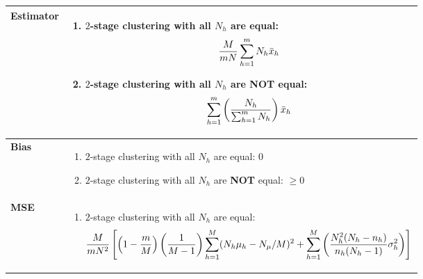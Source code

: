 \begin{longtable}{|p{2cm}|p{12cm}|}
    \hline\endfirsthead
    \hline\endhead
    \hline\endfoot
    \hline\endlastfoot

    \textbf{Estimator} & \begin{minipage}{11cm}
        \vspace{0.2cm}
        \begin{enumerate}
            \item $2$-stage clustering with all $N_h$ are equal:
            \[
                \dfrac{M}{mN} \displaystyle\sum_{h=1}^{m}
                N_h\bar{x}_h
            \]

            \item $2$-stage clustering with all $N_h$ are \textbf{NOT} equal:
            \[
                \displaystyle\sum_{h=1}^{m}
                \left( 
                    \frac{N_h}{\sum_{h=1}^{m} N_h} 
                \right)\bar{x}_h
            \]
            
        \end{enumerate}
        \vspace{0.2cm}
    \end{minipage}\\
    \hline

    \textbf{Bias} & \begin{minipage}{11cm}
        \vspace{0.2cm}
        \begin{enumerate}
            \item $2$-stage clustering with all $N_h$ are equal: $0$

            \item $2$-stage clustering with all $N_h$ are \textbf{NOT} equal: $\geq 0$
        \end{enumerate}
        \vspace{0.2cm}
    \end{minipage}\\
    \hline

    \textbf{MSE} & \begin{minipage}{11cm}
        \vspace{0.2cm}
        \begin{enumerate}
            \item $2$-stage clustering with all $N_h$ are equal:
            \[
                \dfrac{M}{mN^2} \left[
                    \left(1- \dfrac{m}{M} \right)
                    \left(\dfrac{1}{M-1} \right)
                    \displaystyle\sum_{h=1}^{M}
                    (N_h\mu_h - N_\mu/M)^2
                    +
                    \displaystyle\sum_{h=1}^{M}
                    \left(
                        \dfrac{N_h^2 (N_h-n_h)}{n_h(N_h -1)}
                        \sigma_h^2
                    \right)
                \right]
            \]


\end{enumerate}
\end{minipage}
\end{longtable}
